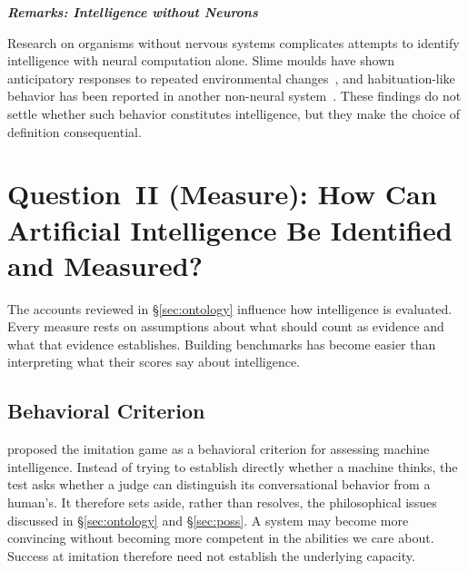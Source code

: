 \documentclass[acmsmall,screen,review,anonymous]{acmart}
\begin{document}
\noindent \textbf{\textit{Remarks: Intelligence without Neurons}}

Research on organisms without nervous systems complicates attempts to identify intelligence with neural computation alone.
%
Slime moulds have shown anticipatory responses to repeated environmental changes~\citep{Saigusa2008AmoebaeAP}, and habituation-like behavior has been reported in another non-neural system~\citep{vogel2016cellfusion}.
%
These findings do not settle whether such behavior constitutes intelligence, but they make the choice of definition consequential.


\section{Question~II (Measure): How Can Artificial Intelligence Be Identified and Measured?}
\label{sec:crit}
The accounts reviewed in \S\ref{sec:ontology} influence how intelligence is evaluated.
%
Every measure rests on assumptions about what should count as evidence and what that evidence establishes.
%
Building benchmarks has become easier than interpreting what their scores say about intelligence.


\subsection{Behavioral Criterion}
\citet{turing1950} proposed the imitation game as a behavioral criterion for assessing machine intelligence.
%
Instead of trying to establish directly whether a machine thinks, the test asks whether a judge can distinguish its conversational behavior from a human's.
%
It therefore sets aside, rather than resolves, the philosophical issues discussed in \S\ref{sec:ontology} and \S\ref{sec:poss}.
%
A system may become more convincing without becoming more competent in the abilities we care about.
%
Success at imitation therefore need not establish the underlying capacity.
\end{document}
